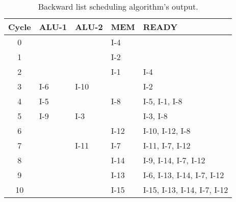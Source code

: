 \begin{itemize}
\begin{table}
\centering
\begin{tabular}{c|l|l|l|l}
  \toprule
  \toprule
  \textbf{Cycle} & \textbf{ALU-1} & \textbf{ALU-2} & \textbf{MEM} & \textbf{READY} \\
  \midrule
  0  &      &      &  I-4  &                               \\ \hline
  1  &      &      &  I-2  &                               \\ \hline
  2  &      &      &  I-1  & I-4                           \\ \hline
  3  & I-6  & I-10 &       & I-2                           \\ \hline
  4  & I-5  &      &  I-8  & I-5, I-1, I-8                 \\ \hline
  5  & I-9  & I-3  &       & I-3, I-8                      \\ \hline
  6  &      &      &  I-12 & I-10, I-12, I-8               \\ \hline
  7  &      & I-11 &  I-7  & I-11, I-7, I-12               \\ \hline
  8  &      &      &  I-14 & I-9, I-14, I-7, I-12          \\ \hline
  9  &      &      &  I-13 & I-6, I-13, I-14, I-7, I-12    \\ \hline
  10 &      &      &  I-15 & I-15, I-13, I-14, I-7, I-12   \\ \hline
  \bottomrule
\end{tabular}
\caption{Backward list scheduling algorithm's output.}
\end{table}

\end{itemize}

